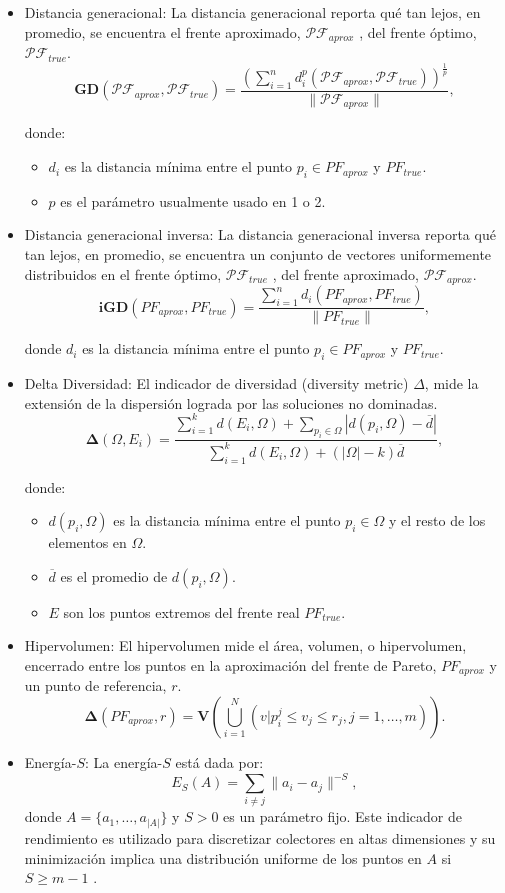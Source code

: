 \begin{itemize}
 \item Distancia generacional: La distancia generacional reporta qué tan lejos, en promedio, se encuentra el frente aproximado, $\mathcal{PF}_{aprox}$ , del frente óptimo, $\mathcal{PF}_{true}$.
 $$\bm{GD}(\mathcal{PF}_{aprox},\mathcal{PF}_{true})=\frac{(\sum^n_{i=1} d_i^p(\mathcal{PF}_{aprox},\mathcal{PF}_{true}))^{\frac{1}{p}}}{\|\mathcal{PF}_{aprox}\|},$$
 
 donde:
 \begin{itemize}
  \item $d_i$ es la distancia mínima entre el punto $p_i \in PF_{aprox}$ y $PF_{true}$.
  \item $p$ es el parámetro usualmente usado en 1 o 2.
 \end{itemize}
 
 
 \item Distancia generacional inversa: La distancia generacional inversa reporta qué tan lejos, en promedio, se encuentra un conjunto de vectores uniformemente distribuidos en el frente óptimo, $\mathcal{PF}_{true}$ , del frente aproximado, $\mathcal{PF}_{aprox}$.
 $$\bm{iGD}(PF_{aprox},PF_{true})=\frac{\sum^n_{i=1} d_i(PF_{aprox},PF_{true})}{\|PF_{true}\|},$$
 
donde $d_i$ es la distancia mínima entre el punto $p_i \in PF_{aprox}$ y $PF_{true}$.


 \item Delta Diversidad: El indicador de diversidad (diversity metric) $\Delta$, mide la extensión de la dispersión lograda por las soluciones no dominadas.
 $$\bm{\Delta}(\Omega,E_i)=\frac{\sum^k_{i=1} d(E_i,\Omega) + \sum_{p_i \in \Omega} |d(p_i,\Omega)-\overline{d}|}{\sum^k_{i=1} d(E_i,\Omega) + (|\Omega| - k)\overline{d}},$$
 
 donde:
 \begin{itemize}
  \item $d(p_i,\Omega)$ es la distancia mínima entre el punto $p_i \in \Omega$ y el resto de los elementos en $\Omega$.
  \item $\overline{d}$ es el promedio de $d(p_i,\Omega)$.
  \item $E$ son los puntos extremos del frente real $PF_{true}$.
 \end{itemize}

 \item Hipervolumen: El hipervolumen mide el área, volumen, o hipervolumen, encerrado entre los puntos en la aproximación del frente de Pareto, $PF_{aprox}$ y un punto de referencia, $r$.
 $$\bm{\Delta}(PF_{aprox},r)=\bm{V}(\bigcup^N_{i=1} (v|p^j_i \leq v_j \leq r_j , j = 1, \dots, m)).$$
 
 \item Energía-$S$: La energía-$S$ está dada por:
 $$E_S(A)= \sum_{i\neq j}\| a_i - a_j\|^{-S},$$
 donde $A = \{ a_1, \dots, a_{|A|}\}$ y $S>0$ es un parámetro fijo. Este indicador de rendimiento es utilizado para discretizar colectores en altas dimensiones y
 su minimización implica una distribución uniforme de los puntos en $A$ si $S\geq m-1$ \cite{hardin2004discretizing}.
\end{itemize}

